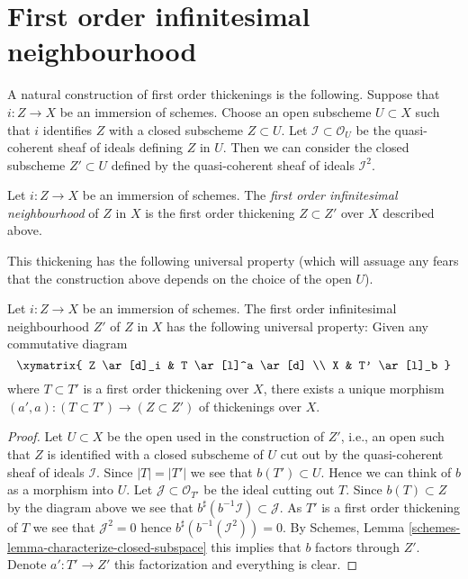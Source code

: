 \section{First order infinitesimal neighbourhood}
\label{section-first-order-infinitesimal-neighbourhood}

\noindent
A natural construction of first order thickenings is the following.
Suppose that $i : Z \to X$ be an immersion of schemes. Choose an
open subscheme $U \subset X$ such that $i$ identifies $Z$ with a closed
subscheme $Z \subset U$. Let $\mathcal{I} \subset \mathcal{O}_U$ be the
quasi-coherent sheaf of ideals defining $Z$ in $U$. Then we can consider
the closed subscheme $Z' \subset U$ defined by the quasi-coherent sheaf
of ideals $\mathcal{I}^2$.

\begin{definition}
\label{definition-first-order-infinitesimal-neighbourhood}
Let $i : Z \to X$ be an immersion of schemes. The
{\it first order infinitesimal neighbourhood} of $Z$ in $X$ is
the first order thickening $Z \subset Z'$ over $X$ described above.
\end{definition}

\noindent
This thickening has the following universal property (which will assuage
any fears that the construction above depends on the choice of the open
$U$).

\begin{lemma}
\label{lemma-first-order-infinitesimal-neighbourhood}
Let $i : Z \to X$ be an immersion of schemes. The first order infinitesimal
neighbourhood $Z'$ of $Z$ in $X$ has the following universal property:
Given any commutative diagram
$$
\xymatrix{
Z \ar[d]_i & T \ar[l]^a \ar[d] \\
X & T' \ar[l]_b
}
$$
where $T \subset T'$ is a first order thickening over $X$, there exists
a unique morphism $(a', a) : (T \subset T') \to (Z \subset Z')$ of
thickenings over $X$.
\end{lemma}

\begin{proof}
Let $U \subset X$ be the open used in the construction of $Z'$, i.e., an
open such that $Z$ is identified with a closed subscheme of $U$ cut out by
the quasi-coherent sheaf of ideals $\mathcal{I}$.
Since $|T| = |T'|$ we see that $b(T') \subset U$. Hence we can
think of $b$ as a morphism into $U$. Let $\mathcal{J} \subset \mathcal{O}_{T'}$
be the ideal cutting out $T$. Since $b(T) \subset Z$ by the diagram above
we see that $b^\sharp(b^{-1}\mathcal{I}) \subset \mathcal{J}$. As
$T'$ is a first order thickening of $T$ we see that $\mathcal{J}^2 = 0$
hence $b^\sharp(b^{-1}(\mathcal{I}^2)) = 0$. By
Schemes, Lemma \ref{schemes-lemma-characterize-closed-subspace}
this implies that $b$ factors through $Z'$. Denote $a' : T' \to Z'$
this factorization and everything is clear.
\end{proof}

